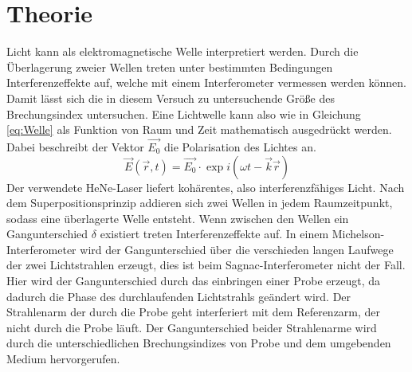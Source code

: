 \section{Theorie}
\label{sec:Theorie}
Licht kann als elektromagnetische Welle interpretiert werden. Durch die Überlagerung
zweier Wellen treten unter bestimmten Bedingungen Interferenzeffekte auf, welche mit
einem Interferometer vermessen werden können. Damit lässt sich die in diesem Versuch
zu untersuchende Größe des Brechungsindex untersuchen.
Eine Lichtwelle kann also wie in Gleichung \ref{eq:Welle} als Funktion von Raum und Zeit
mathematisch ausgedrückt werden. Dabei beschreibt der Vektor $\vec{E_0}$ die Polarisation des Lichtes an.
\begin{equation}
	\vec{E}(\vec{r},t) = \vec{E_0}\cdot \exp i(\omega t - \vec{k}\vec{r})
\label{eq:Welle}
\end{equation}
Der verwendete HeNe-Laser liefert kohärentes, also interferenzfähiges Licht.
Nach dem Superpositionsprinzip addieren sich zwei Wellen in jedem Raumzeitpunkt,
sodass eine überlagerte Welle entsteht. Wenn zwischen den Wellen ein Gangunterschied
$\delta$ existiert treten Interferenzeffekte auf. In einem Michelson-Interferometer wird der
Gangunterschied über die verschieden langen Laufwege der zwei Lichtstrahlen erzeugt, dies ist
beim Sagnac-Interferometer nicht der Fall. Hier wird der Gangunterschied durch das einbringen
einer Probe erzeugt, da dadurch die Phase des durchlaufenden Lichtstrahls geändert wird.
Der Strahlenarm der durch die Probe geht interferiert mit dem Referenzarm,
der nicht durch die Probe läuft. Der Gangunterschied beider Strahlenarme wird durch die
unterschiedlichen Brechungsindizes von Probe und dem umgebenden Medium hervorgerufen.
